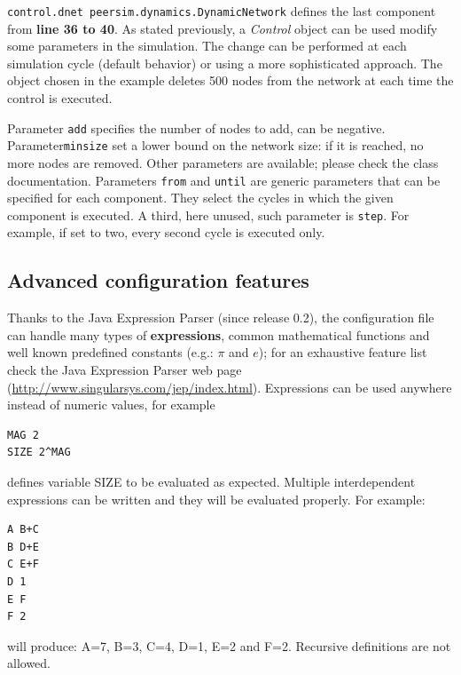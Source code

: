 \documentclass[a4paper,11pt]{article}
\begin{document}
\texttt{control.dnet
peersim.dynamics.DynamicNetwork} defines the last component
from \textbf{line 36 to 40}. 
As stated previously, a \emph{Control}
object can be used modify some parameters in the simulation.
The change can be performed at each simulation cycle (default
behavior) or using a more sophisticated approach. The object chosen
in the example deletes 500 nodes from the network at each time
the control is executed.

Parameter \texttt{add} specifies the number of nodes to add, can be negative.
Parameter\texttt{minsize} set a lower bound on the network size: if it is
reached, no more nodes are removed.
Other parameters are available; please check the class documentation.
Parameters \texttt{from} and \texttt{until} are generic parameters that can
be specified for each component.
They select the cycles in which the given component is executed.
A third, here unused, such parameter is \texttt{step}.
For example, if set to two, every second cycle is executed only.

\subsection{Advanced configuration features}

Thanks to the Java Expression Parser (since release
0.2), the configuration
file can handle many types of \textbf{expressions},
common mathematical functions and well known predefined
constants (e.g.: $\pi$ and $e$); for an exhaustive feature list check
the Java Expression Parser web page
(\url{http://www.singularsys.com/jep/index.html}).
Expressions can be used anywhere instead of numeric values, for example
\begin{verbatim}
MAG 2
SIZE 2^MAG
\end{verbatim}
defines variable SIZE to be evaluated as expected.
Multiple interdependent expressions can be written and they will
be evaluated properly. For example:
\begin{verbatim}
A B+C
B D+E
C E+F
D 1
E F
F 2
\end{verbatim}
will produce: A=7, B=3, C=4, D=1, E=2 and F=2.
Recursive definitions are not allowed.
\end{document}
